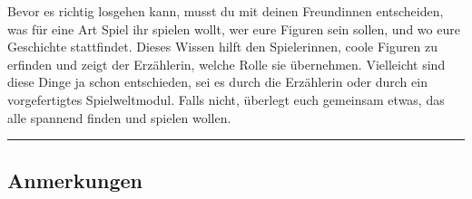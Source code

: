 \begin{multicols}{2}
Bevor es richtig losgehen kann, musst du mit deinen Freundinnen
entscheiden, was für eine Art Spiel ihr spielen wollt, wer eure Figuren
sein sollen, und wo eure Geschichte stattfindet. Dieses Wissen hilft den
Spielerinnen, coole Figuren zu erfinden und zeigt der Erzählerin, welche
Rolle sie übernehmen. Vielleicht sind diese Dinge ja schon entschieden,
sei es durch die Erzählerin oder durch ein vorgefertigtes
Spielweltmodul. Falls nicht, überlegt euch gemeinsam etwas, das alle
spannend finden und spielen wollen.

\TableResult
\end{multicols}



\vfill
\begin{center}\rule{1.0\linewidth}{\linethickness}\end{center}
\subsection{Anmerkungen}\label{Anmerkugen}

